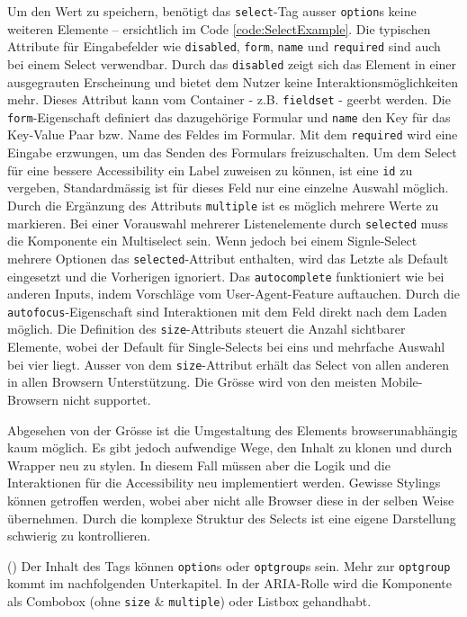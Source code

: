 Um den Wert zu speichern, benötigt das \texttt{select}-Tag ausser \texttt{option}s keine weiteren Elemente – ersichtlich im Code \ref{code:SelectExample}.
Die typischen Attribute für Eingabefelder wie \texttt{disabled}, \texttt{form}, \texttt{name} und \texttt{required} sind auch bei einem Select verwendbar.
Durch das \texttt{disabled} zeigt sich das Element in einer ausgegrauten Erscheinung und bietet dem Nutzer keine Interaktionsmöglichkeiten mehr.
Dieses Attribut kann vom Container - z.B. \texttt{fieldset} - geerbt werden.
Die \texttt{form}-Eigenschaft definiert das dazugehörige Formular und \texttt{name} den Key für das Key-Value Paar bzw. Name des Feldes im Formular. 
Mit dem \texttt{required} wird eine Eingabe erzwungen, um das Senden des Formulars freizuschalten.
Um dem Select für eine bessere Accessibility ein Label zuweisen zu können, ist eine \texttt{id} zu vergeben, 
Standardmässig ist für dieses Feld nur eine einzelne Auswahl möglich.
Durch die Ergänzung des Attributs \texttt{multiple} ist es möglich mehrere Werte zu markieren.
Bei einer Vorauswahl mehrerer Listenelemente durch \texttt{selected} muss die Komponente ein Multiselect sein.
Wenn jedoch bei einem Signle-Select mehrere Optionen das \texttt{selected}-Attribut enthalten, wird das Letzte als Default eingesetzt und die Vorherigen ignoriert.
Das \texttt{autocomplete} funktioniert wie bei anderen Inputs, indem Vorschläge vom User-Agent-Feature auftauchen.
Durch die \texttt{autofocus}-Eigenschaft sind Interaktionen mit dem Feld direkt nach dem Laden möglich.
Die Definition des \texttt{size}-Attributs steuert die Anzahl sichtbarer Elemente, wobei der Default für Single-Selects bei eins und mehrfache Auswahl bei vier liegt.
Ausser von dem \texttt{size}-Attribut erhält das Select von allen anderen in allen Browsern Unterstützung.
Die Grösse wird von den meisten Mobile-Browsern nicht supportet.

Abgesehen von der Grösse ist die Umgestaltung des Elements browserunabhängig kaum möglich.
Es gibt jedoch aufwendige Wege, den Inhalt zu klonen und durch Wrapper neu zu stylen.
In diesem Fall müssen aber die Logik und die Interaktionen für die Accessibility neu implementiert werden.
Gewisse Stylings können getroffen werden, wobei aber nicht alle Browser diese in der selben Weise übernehmen.
Durch die komplexe Struktur des Selects ist eine eigene Darstellung schwierig zu kontrollieren.

(\cite{selectMdn}) Der Inhalt des Tags können \texttt{option}s oder \texttt{optgroup}s sein.
Mehr zur \texttt{optgroup} kommt im nachfolgenden Unterkapitel.
In der ARIA-Rolle wird die Komponente als Combobox (ohne \texttt{size} \& \texttt{multiple}) oder Listbox gehandhabt.


